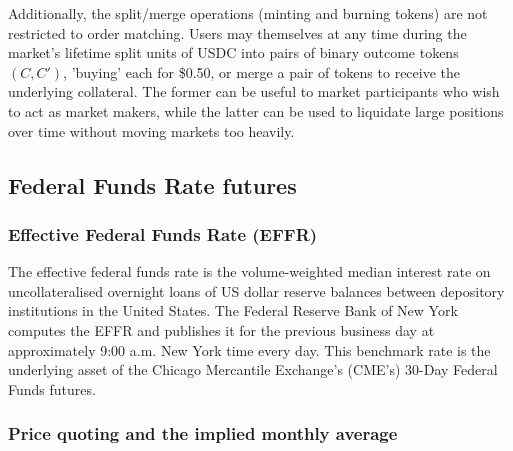 Additionally, the split/merge operations (minting and burning tokens) are not restricted to order matching.
Users may themselves at any time during the market's lifetime split units of USDC into pairs of binary outcome tokens $(C, C')$, 'buying' each for \$0.50, or merge a pair of tokens to receive the underlying collateral.
The former can be useful to market participants who wish to act as market makers, while the latter can be used to liquidate large positions over time without moving markets too heavily.





\subsection{Federal Funds Rate futures}

\subsubsection{Effective Federal Funds Rate (EFFR)}

The effective federal funds rate is the volume-weighted median interest rate on uncollateralised overnight loans of US dollar reserve balances between depository institutions in the United States. The Federal Reserve Bank of New York computes the EFFR and publishes it for the previous business day at approximately 9:00 a.m. New York time every day. This benchmark rate is the underlying asset of the Chicago Mercantile Exchange’s (CME's) 30-Day Federal Funds futures. \citep{FED_EFFR_NY}


\subsubsection{Price quoting and the implied monthly average}


